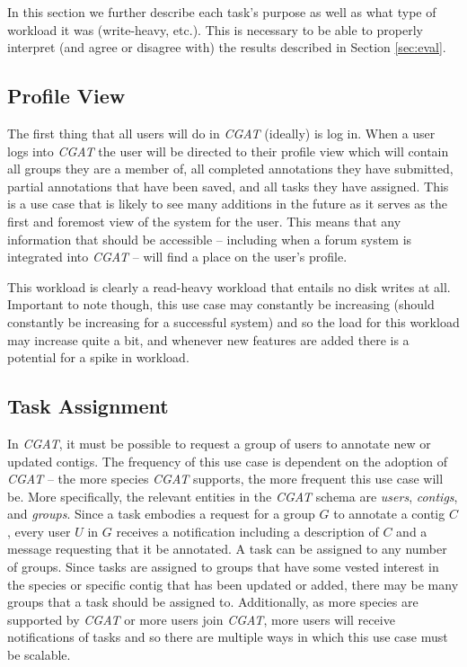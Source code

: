 \documentclass[10pt, conference, compsocconf]{IEEEtran}
\begin{document}
In this section we further describe each task's purpose as well as what type of
workload it was (write-heavy, etc.). This is necessary to be able to properly
interpret (and agree or disagree with) the results described in Section
\ref{sec:eval}.

\subsection{Profile View}
The first thing that all users will do in \textit{CGAT} (ideally) is log in.
When a user logs into \textit{CGAT} the user will be directed to their profile
view which will contain all groups they are a member of, all completed
annotations they have submitted, partial annotations that have been saved, and
all tasks they have assigned. This is a use case that is likely to see many
additions in the future as it serves as the first and foremost view of the
system for the user. This means that any information that should be accessible
-- including when a forum system is integrated into \textit{CGAT} -- will find
a place on the user's profile.

This workload is clearly a read-heavy workload that entails no disk writes at
all. Important to note though, this use case may constantly be increasing
(should constantly be increasing for a successful system) and so the load for
this workload may increase quite a bit, and whenever new features are added
there is a potential for a spike in workload.

\subsection{Task Assignment}
In \textit{CGAT}, it must be possible to request a group of users to annotate
new or updated contigs. The frequency of this use case is dependent on the
adoption of \textit{CGAT} -- the more species \textit{CGAT} supports, the more
frequent this use case will be. More specifically, the relevant entities in the
\textit{CGAT} schema are \textit{users}, \textit{contigs}, and \textit{groups}.
Since a task embodies a request for a group $G$ to annotate a contig $C$, every
user $U$ in $G$ receives a notification including a description of $C$ and a
message requesting that it be annotated. A task can be assigned to any number
of groups. Since tasks are assigned to groups that have some vested interest in
the species or specific contig that has been updated or added, there may be
many groups that a task should be assigned to. Additionally, as more species
are supported by \textit{CGAT} or more users join \textit{CGAT}, more users
will receive notifications of tasks and so there are multiple ways in which
this use case must be scalable.
\end{document}

